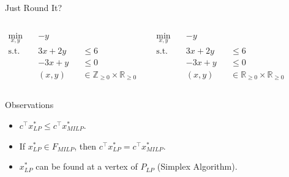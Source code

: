 \begin{frame}{Just Round It?}
\begin{columns}
	\begin{tcolorbox}[colback=white]
    \begin{align*}
    	\min_{x,y}\quad & -y \\
    	\text{s.t.}\quad & 3x + 2y &&\leq 6 \\
    	& -3x + y &&\leq 0 \\
    	& (x, y) &&\in \mathbb{Z}_{\geq 0} \times \mathbb{R}_{\geq 0}
    \end{align*}
	\end{tcolorbox}

	\begin{tcolorbox}[colback=white]
    \begin{align*}
    	\min_{x,y}\quad & -y \\
    	\text{s.t.}\quad & 3x + 2y &&\leq 6 \\
    	& -3x + y &&\leq 0 \\
    	& (x, y) &&\in \mathbb{R}_{\geq 0} \times \mathbb{R}_{\geq 0}
    \end{align*}
	\end{tcolorbox}
    
    \end{columns}
\end{frame}

\begin{frame}{Observations}
\begin{itemize}[<+->]
\item $c^\top x_{LP}^* \leq c^\top x_{MILP}^*$.

\item If $x_{LP}^* \in F_{MILP}$, then $c^\top x_{LP}^* = c^\top x_{MILP}^*$.

\item $x_{LP}^*$ can be found at a vertex of $P_{LP}$ (Simplex Algorithm).
\end{itemize}
\end{frame}